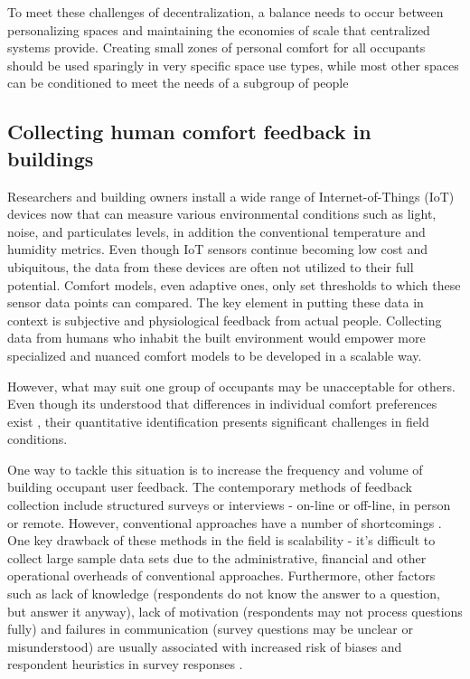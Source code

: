 \documentclass[]{interact}
\theoremstyle{plain}%
\theoremstyle{definition}
\theoremstyle{remark}
\begin{document}
To meet these challenges of decentralization, a balance needs to occur between personalizing spaces and maintaining the economies of scale that centralized systems provide. Creating small zones of personal comfort for all occupants should be used sparingly in very specific space use types, while most other spaces can be conditioned to meet the needs of a subgroup of people 


\subsection{Collecting human comfort feedback in buildings}
Researchers and building owners install a wide range of Internet-of-Things (IoT) devices now that can measure various environmental conditions such as light, noise, and particulates levels, in addition the conventional temperature and humidity metrics. 
Even though IoT sensors continue becoming low cost and ubiquitous, the data from these devices are often not utilized to their full potential. Comfort models, even adaptive ones, only set thresholds to which these sensor data points can compared. The key element in putting these data in context is subjective and physiological feedback from actual people. Collecting data from humans who inhabit the built environment would empower more specialized and nuanced comfort models to be developed in a scalable way.

However, what may suit one group of occupants may be unacceptable for others. Even though its understood that differences in individual comfort preferences exist \cite{WANG2018181}, their quantitative identification presents significant challenges in field conditions.

One way to tackle this situation is to increase the frequency and volume of building occupant user feedback. The contemporary methods of feedback collection include structured surveys or interviews - on-line or off-line, in person or remote. However, conventional approaches have a number of shortcomings  \cite{oecd}. One key drawback of these methods in the field is scalability - it’s difficult to collect large sample data sets due to the administrative, financial and other operational overheads of conventional approaches. Furthermore, other factors such as lack of knowledge (respondents do not know the answer to a question, but answer it anyway), lack of motivation (respondents may not process questions fully) and failures in communication (survey questions may be unclear or misunderstood) are usually associated with increased risk of biases and respondent heuristics in survey responses  \cite{bradburn2004asking}.
\end{document}
